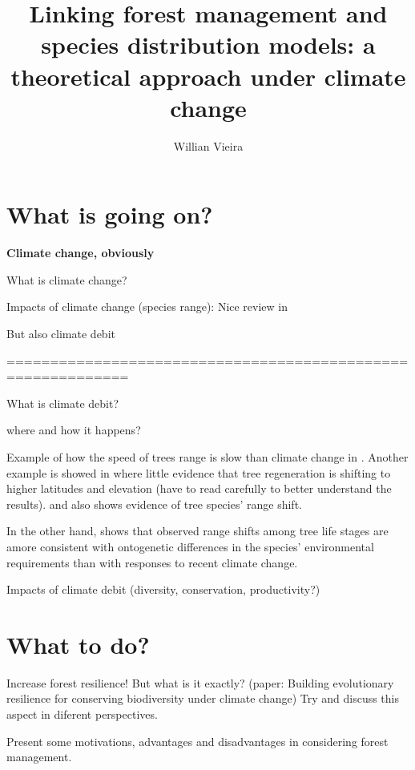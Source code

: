 \documentclass[a4paper,12pt,twoside]{article}
\begin{document}
\title{Linking forest management and species distribution models: a theoretical approach under climate change}

\author{Willian Vieira}

\maketitle

\section{What is going on?}

\textbf{Climate change, obviously}

What is climate change?

Impacts of climate change (species range): Nice review in \cite{Price2013}

But also climate debit

============================================================

What is climate debit?

where and how it happens?

Example of how the speed of trees range is slow than climate change in \cite{Sittaro2017}. Another example is showed in \cite{Serra-Diaz2016} where little evidence that tree regeneration is shifting to higher latitudes and elevation (have to read carefully to better understand the results). \cite{Monleon2015} and \cite{Boisvert-Marsh2014} also shows evidence of tree species' range shift.

In the other hand, \cite{Malis2016} shows that observed range shifts among tree life stages are amore consistent with ontogenetic differences in the species' environmental requirements than with responses to recent climate change.

Impacts of climate debit (diversity, conservation, productivity?)

\section{What to do?}

Increase forest resilience! But what is it exactly?
(paper: Building evolutionary resilience for conserving biodiversity under climate change) Try and discuss this aspect in diferent perspectives.

Present some motivations, advantages and disadvantages in considering forest management.
\end{document}
